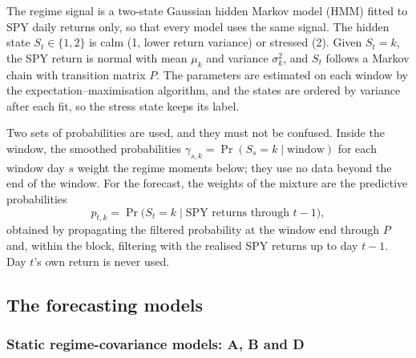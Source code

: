 The regime signal is a two-state Gaussian hidden Markov model (HMM) fitted to SPY daily returns only, so that every model uses the same signal. The hidden state $S_t\in\{1,2\}$ is calm (1, lower return variance) or stressed (2). Given $S_t=k$, the SPY return is normal with mean $\mu_k$ and variance $\sigma_k^2$, and $S_t$ follows a Markov chain with transition matrix $P$. The parameters are estimated on each window by the expectation--maximisation algorithm, and the states are ordered by variance after each fit, so the stress state keeps its label.

Two sets of probabilities are used, and they must not be confused. Inside the window, the smoothed probabilities $\gamma_{s,k}=\Pr(S_s=k\mid\text{window})$ for each window day $s$ weight the regime moments below; they use no data beyond the end of the window. For the forecast, the weights of the mixture are the predictive probabilities
\begin{equation}
p_{t,k}=\Pr\bigl(S_t=k\mid \text{SPY returns through } t-1\bigr),
\end{equation}
obtained by propagating the filtered probability at the window end through $P$ and, within the block, filtering with the realised SPY returns up to day $t-1$. Day $t$'s own return is never used.

\subsection{The forecasting models}

\subsubsection{Static regime-covariance models: A, B and D}\label{sec:static}

